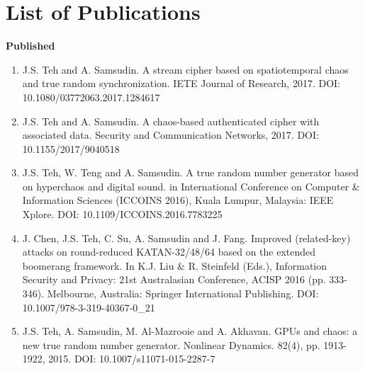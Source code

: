 \clearpage{}
\chapter{List of Publications}
\thispagestyle{empty}
\pagestyle{empty}

\textbf{Published}
\begin{enumerate}
\item J.S. Teh and A. Samsudin. A stream cipher based on spatiotemporal chaos and true random synchronization. IETE Journal of Research, 2017. \newline DOI: 10.1080/03772063.2017.1284617 
\item J.S. Teh and A. Samsudin. A chaos-based authenticated cipher with associated data. Security and Communication Networks, 2017. DOI: 10.1155/2017/9040518 
\item J.S. Teh, W. Teng and A. Samsudin. A true random number generator based on hyperchaos and digital sound. in International Conference on Computer \& Information Sciences (ICCOINS 2016), Kuala Lumpur, Malaysia: IEEE Xplore. DOI: 10.1109/ICCOINS.2016.7783225 \newline [Scopus]
\item J. Chen, J.S. Teh, C. Su, A. Samsudin and J. Fang. Improved (related-key) attacks on round-reduced KATAN-32/48/64 based on the extended boomerang framework. In K.J. Liu \& R. Steinfeld (Eds.), Information Security and Privacy: 21st Australasian Conference, ACISP 2016 (pp. 333-346). Melbourne, Australia: Springer International Publishing. DOI: 10.1007/978-3-319-40367-0\_21 
\item J.S. Teh, A. Samsudin, M. Al-Mazrooie and A. Akhavan. GPUs and chaos: a new true random number generator. Nonlinear Dynamics. 82(4), pp. 1913-1922, 2015. DOI: 10.1007/s11071-015-2287-7 
\end{enumerate}

